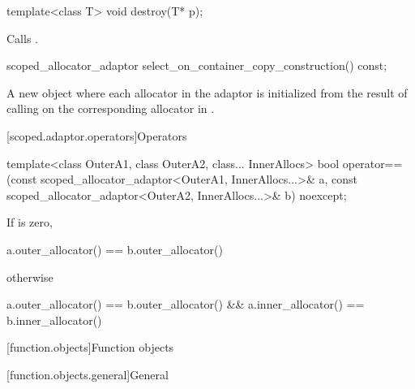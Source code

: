 %
\begin{itemdecl}
template<class T>
  void destroy(T* p);
\end{itemdecl}

\begin{itemdescr}
\pnum
\effects
Calls .
\end{itemdescr}

%
\begin{itemdecl}
scoped_allocator_adaptor select_on_container_copy_construction() const;
\end{itemdecl}

\begin{itemdescr}
\pnum
\returns
A new  object where each allocator  in the
adaptor is initialized from the result of calling
 on the
corresponding allocator in .
\end{itemdescr}

[scoped.adaptor.operators]{Operators}

%
\begin{itemdecl}
template<class OuterA1, class OuterA2, class... InnerAllocs>
  bool operator==(const scoped_allocator_adaptor<OuterA1, InnerAllocs...>& a,
                  const scoped_allocator_adaptor<OuterA2, InnerAllocs...>& b) noexcept;
\end{itemdecl}

\begin{itemdescr}
\pnum
\returns
If  is zero,
\begin{codeblock}
a.outer_allocator() == b.outer_allocator()
\end{codeblock}
otherwise
\begin{codeblock}
a.outer_allocator() == b.outer_allocator() && a.inner_allocator() == b.inner_allocator()
\end{codeblock}
\end{itemdescr}

[function.objects]{Function objects}

[function.objects.general]{General}


